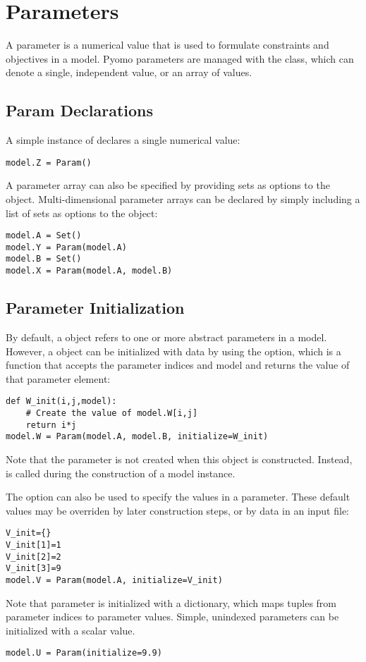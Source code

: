 \section{Parameters}

A parameter is a numerical value that is used to formulate constraints
and objectives in a model.  Pyomo parameters are managed with the  class, which can denote a single, independent value, or an array of values.


\subsection{Param Declarations}


A simple instance of  declares a single numerical value:
\begin{lstlisting}
model.Z = Param()
\end{lstlisting}
A parameter array can also be specified by providing sets as options
to the  object.  Multi-dimensional parameter arrays can be declared by simply including a list of sets as options to the  object:
\begin{lstlisting}
model.A = Set()
model.Y = Param(model.A)
model.B = Set()
model.X = Param(model.A, model.B)
\end{lstlisting}


\subsection{Parameter Initialization}

By default, a  object refers to one or more abstract parameters in a model.  However,
a  object can be initialized with data by using the  option, which is a function 
that accepts the parameter indices and model and returns the value of that parameter element:
\begin{lstlisting}
def W_init(i,j,model):
    # Create the value of model.W[i,j]
    return i*j
model.W = Param(model.A, model.B, initialize=W_init)
\end{lstlisting}
Note that the parameter  is not created when this object is
constructed.  Instead,  is called during the construction of a
model instance.

The  option can also be used to specify the values in
a parameter.  These default values may be overriden by later construction
steps, or by data in an input file:
\begin{lstlisting}
V_init={}
V_init[1]=1
V_init[2]=2
V_init[3]=9
model.V = Param(model.A, initialize=V_init)
\end{lstlisting}
Note that parameter  is initialized with a dictionary, which maps 
tuples from parameter indices to parameter values.  Simple, unindexed
parameters can be initialized with a scalar value.
\begin{lstlisting}
model.U = Param(initialize=9.9)
\end{lstlisting}

